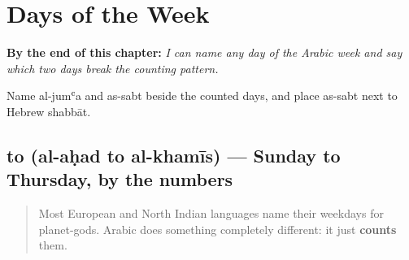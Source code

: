 
\chapter{Days of the Week}
\label{ch:ar-days-of-the-week}

\begin{chapteropening}
\textbf{By the end of this chapter:} \emph{I can name any day of the Arabic week and say which two days break the counting pattern.}

Name al-jumʿa and as-sabt beside the counted days, and place as-sabt next to Hebrew shabbāt.
\end{chapteropening}

\section[\texorpdfstring{\ar{الأحد} \ar{الإثنين} … (al-aḥad …)}{الأحد الإثنين … (al-aḥad …)}]{ to  (al-aḥad to al-khamīs) — Sunday to Thursday, by the numbers}

\label{lesson:AR-C08-al-ahad-al-khamis}



\begin{quote}
Most European and North Indian languages name their weekdays for planet-gods. Arabic does something completely different: it just \textbf{counts} them.
\end{quote}

